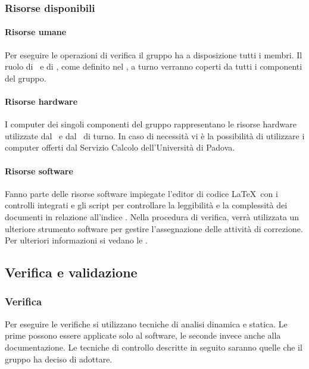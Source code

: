 \documentclass[../PianoDiQualifica.tex]{subfiles}
\begin{document}
		    \subsubsection{Risorse disponibili}
		    \paragraph{Risorse umane}
		    Per eseguire le operazioni di verifica il gruppo ha a disposizione tutti i membri. Il ruolo di \responsabilediprogetto\ e di \verificatore, come definito nel \pianodiprogettov, a turno verranno coperti da tutti i componenti del gruppo.
		    \paragraph{Risorse hardware}
		    I computer dei singoli componenti del gruppo rappresentano le risorse hardware utilizzate dal \responsabilediprogetto\ e dal \verificatore\ di turno. In caso di necessità vi è la possibilità di utilizzare i computer offerti dal Servizio Calcolo dell'Università di Padova.
		    \paragraph{Risorse software}
		    Fanno parte delle risorse software impiegate l'editor di codice \LaTeX\ con i controlli integrati e gli script per controllare la leggibilità e la complessità dei documenti in relazione all'indice . Nella procedura di verifica, verrà utilizzata un ulteriore strumento software per gestire l'assegnazione delle attività di correzione. Per ulteriori informazioni si vedano le \normediprogettov.

		\subsection{Verifica e validazione}
			\subsubsection{Verifica}
			Per eseguire le verifiche si utilizzano tecniche di analisi dinamica e statica. Le prime possono essere applicate solo al software, le seconde invece anche alla documentazione. Le tecniche di controllo descritte in seguito saranno quelle che il gruppo ha deciso di adottare.
\end{document}
